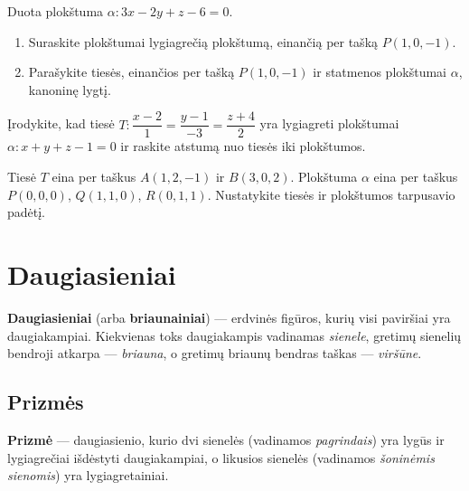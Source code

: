 \begin{exercise}
Duota plokštuma $\alpha\colon 3x - 2y + z - 6 = 0$.
\begin{enumerate}[label=\alph*)]
  \item Suraskite plokštumai lygiagrečią plokštumą, einančią per tašką $P(1,0,-1)$.
  \item Parašykite tiesės, einančios per tašką $P(1,0,-1)$ ir statmenos plokštumai
        $\alpha$, kanoninę lygtį.
\end{enumerate}
\end{exercise}

\begin{exercise}
Įrodykite, kad tiesė $T\colon \dfrac{x-2}{1} = \dfrac{y-1}{-3} = \dfrac{z+4}{2}$
yra lygiagreti plokštumai $\alpha\colon x + y + z - 1 = 0$ ir raskite
atstumą nuo tiesės iki plokštumos.
\end{exercise}

\begin{exercise}
Tiesė $T$ eina per taškus $A(1, 2, -1)$ ir $B(3, 0, 2)$.
Plokštuma $\alpha$ eina per taškus $P(0,0,0)$, $Q(1,1,0)$, $R(0,1,1)$.
Nustatykite tiesės ir plokštumos tarpusavio padėtį.
\end{exercise}


\section{Daugiasieniai}

\begin{definition}
\textbf{Daugiasieniai} (arba \textbf{briaunainiai}) --- erdvinės figūros, kurių visi paviršiai yra daugiakampiai. Kiekvienas toks daugiakampis vadinamas \textit{sienele}, gretimų sienelių bendroji atkarpa --- \textit{briauna}, o gretimų briaunų bendras taškas --- \textit{viršūne}.
\end{definition}

\subsection{Prizmės}

\begin{definition}
\textbf{Prizmė} --- daugiasienio, kurio dvi sienelės (vadinamos \textit{pagrindais}) yra lygūs ir lygiagrečiai išdėstyti daugiakampiai, o likusios sienelės (vadinamos \textit{šoninėmis sienomis}) yra lygiagretainiai.
\end{definition}

